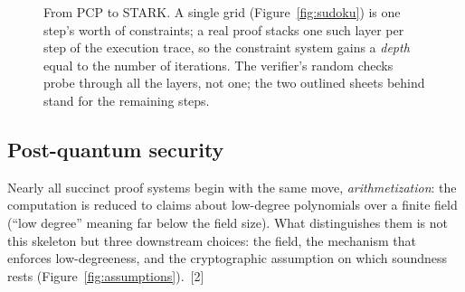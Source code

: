 \documentclass[11pt]{article}
\begin{document}
\begin{figure}[H]\centering
{}
\caption{From PCP to STARK. A single grid (Figure~\ref{fig:sudoku}) is one step's worth of constraints; a
real proof stacks one such layer per step of the execution trace, so the constraint system gains a
\emph{depth} equal to the number of iterations. The verifier's random checks probe through all the layers,
not one; the two outlined sheets behind stand for the remaining steps.}
\label{fig:starkstack}
\end{figure}

\subsection{Post-quantum security}

Nearly all succinct proof systems begin with the same move, \emph{arithmetization}: the computation is
reduced to claims about low-degree polynomials over a finite field (``low degree'' meaning far below the
field size). What distinguishes them is not this skeleton but three downstream choices: the field,
the mechanism that enforces low-degreeness, and the cryptographic assumption on which soundness rests
(Figure~\ref{fig:assumptions}).~[2]
\end{document}
